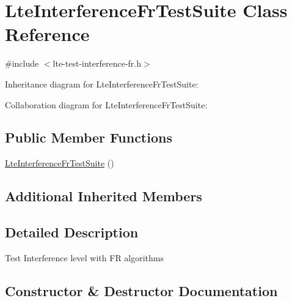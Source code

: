 \hypertarget{classLteInterferenceFrTestSuite}{}\section{Lte\+Interference\+Fr\+Test\+Suite Class Reference}
\label{classLteInterferenceFrTestSuite}


{\ttfamily \#include $<$lte-\/test-\/interference-\/fr.\+h$>$}



Inheritance diagram for Lte\+Interference\+Fr\+Test\+Suite\+:


Collaboration diagram for Lte\+Interference\+Fr\+Test\+Suite\+:
\subsection*{Public Member Functions}
\begin{DoxyCompactItemize}
\item 
\hyperlink{classLteInterferenceFrTestSuite_ab5ae06501c23a50a919a2aeb46e57f96}{Lte\+Interference\+Fr\+Test\+Suite} ()
\end{DoxyCompactItemize}
\subsection*{Additional Inherited Members}


\subsection{Detailed Description}
Test Interference level with FR algorithms 

\subsection{Constructor \& Destructor Documentation}
